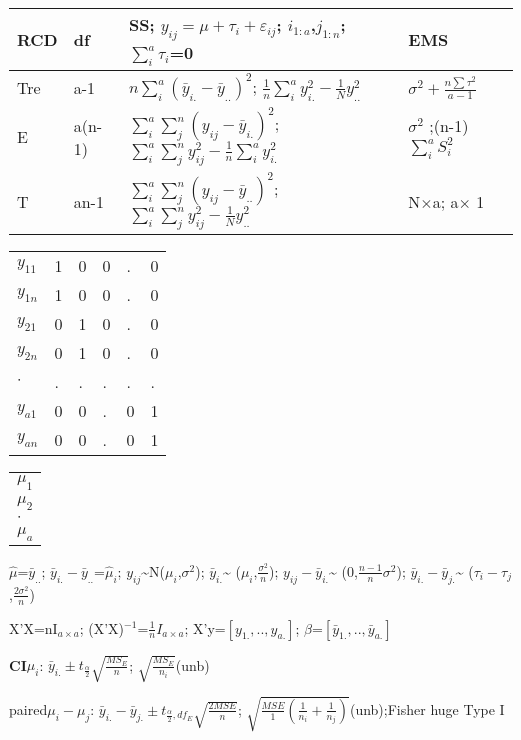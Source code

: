 \documentclass[
  10pt,
  twocolumn]{article}
\begin{document}
\begin{tabular}{l|l|l|l|}\hline
RCD& df & SS; $y_{ij}=\mu+\tau_{i}+\varepsilon_{ij}$; $i_{1:a}$,$j_{1:n}$; $\sum_i^a\tau_i$=0 & EMS  \\\hline
Tre&a-1&$n\sum^a_i(\bar y_{i.}-\bar y_{..})^2$; $\frac1n\sum^a_iy_{i.}^2-\frac1Ny_{..}^2$& $\sigma^2+\frac{n\sum\tau^2}{a-1}$\\
E &a(n-1)&$\sum^a_i\sum^n_j(y_{ij} - \bar y_{i.})^2$;$\sum^a_i\sum^n_jy_{ij}^2-\frac1n\sum^a_iy_{i.}^2$& $\sigma^2$ ;(n-1)$\sum_i^aS_i^2$\\
T &an-1&$\sum^a_i\sum^n_j(y_{ij}-\bar y_{..})^2$; $\sum^a_i\sum^n_jy_{ij}^2-\frac1Ny_{..}^2$& N$\times$a; a$\times$ 1\\\hline
\end{tabular}
\begin{tabular}{l|lllll|}
$y_{11}$&1& 0 & 0 & . & 0 \\
$y_{1n}$&1& 0 & 0 & . & 0 \\\hline
$y_{21}$&0& 1 & 0 & . & 0 \\
$y_{2n}$&0& 1 & 0 & . & 0 \\\hline
$\cdot$ &.& . & . & . & . \\\hline
$y_{a1}$&0& 0 & . & 0 & 1 \\
$y_{an}$&0& 0 & . & 0 & 1 \\
\end{tabular}
\begin{tabular}{|l|}
$\mu_{1}$\\
$\mu_{2}$\\
$\cdot$\\
$\mu_{a}$\\
\end{tabular}

\(\hat\mu\)=\(\bar y_{..}\); \(\bar y_{i.}-\bar y_{..}\)=\(\hat\mu_i\);
\(y_{ij}\)\textasciitilde N(\(\mu_i\),\(\sigma^2\));
\(\bar y_{i.}\)\textasciitilde{} (\(\mu_i\),\(\frac{\sigma^2}n\));
\(y_{ij}-\bar y_{i.}\)\textasciitilde{} (0,\(\frac{n-1}n\sigma^2\));
\(\bar y_{i.}-\bar y_{j.}\)\textasciitilde{}
(\(\tau_i-\tau_j\),\(\frac{2\sigma^2}n\))

X'X=nI\(_{a\times a}\); (X'X)\(^{-1}\)=\(\frac1nI_{a\times a}\);
X'y=\([y_{1.},..,y_{a.}]\); \(\beta\)=\([\bar y_{1.},..,\bar y_{a.}]\)

\dotfill

\textbf{CI}\(\mu_i\):
\(\bar y_{i.}\pm t_{\frac{\alpha}2}\sqrt{\frac{MS_E}{n}}\);
\(\sqrt{\frac{MS_E}{n_i}}\)(unb)

paired\(\mu_i-\mu_j\):
\(\bar y_{i.}-\bar y_{j.}\pm t_{\frac{\alpha}2,df_E}\sqrt{\frac{2MSE}{n}}\);
\(\sqrt{\frac{MSE}1(\frac{1}{n_i}+\frac{1}{n_j})}\)(unb);Fisher huge
Type I
\end{document}
